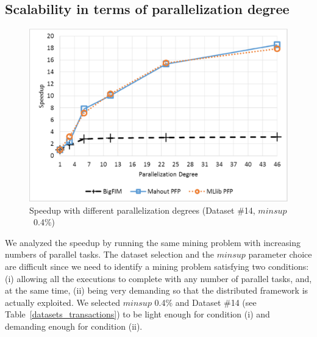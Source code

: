 \documentclass[preprint,review,12pt]{elsarticle}
\begin{document}
\subsection{Scalability in terms of parallelization degree}
\label{nr_machines}



\begin{figure}[!t]
\begin{center}
\includegraphics[width=5in]{machines_big.eps}
\caption{Speedup with different parallelization degrees (Dataset \#14,
 $minsup$~0.4\%)}
\label{nr_machines_speedup}
\end{center}
\end{figure}



We analyzed the speedup by running the same mining problem with increasing numbers of parallel tasks.
The dataset selection and the $minsup$ parameter choice are difficult 
since we need to identify a mining problem satisfying two conditions:
(i) allowing all the executions to complete with any number of parallel tasks, 
and, at the same time, 
(ii) being very demanding so that the distributed framework is actually exploited. 
We selected $minsup$ 0.4\% and Dataset \#14 (see Table~\ref{datasets_transactions}) 
to be light enough for condition (i) and demanding enough for condition (ii).
\end{document}
